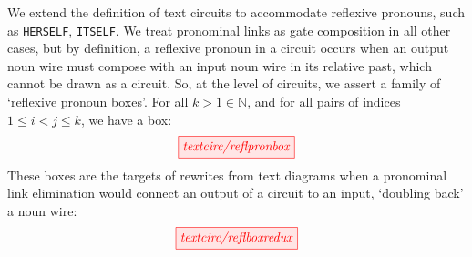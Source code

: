 \begin{convention}\label{asm:reflpron}
We extend the definition of text circuits to accommodate reflexive pronouns, such as \texttt{HERSELF}, \texttt{ITSELF}. We treat pronominal links as gate composition in all other cases, but by definition, a reflexive pronoun in a circuit occurs when an output noun wire must compose with an input noun wire in its relative past, which cannot be drawn as a circuit. So, at the level of circuits, we assert a family of `reflexive pronoun boxes'. For all $k > 1 \in \mathbb{N}$, and for all pairs of indices $1 \leq i < j \leq k$, we have a box:
\[
\tikzfig{textcirc/reflpronbox}
\]
These boxes are the targets of rewrites from text diagrams when a pronominal link elimination would connect an output of a circuit to an input, `doubling back' a noun wire:
\[
\tikzfig{textcirc/reflboxredux} 
\]
\end{convention}

